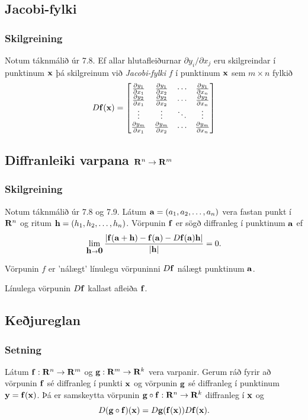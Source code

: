 \subsection{Jacobi-fylki} 
 \subsubsection{Skilgreining }
 Notum táknmálið úr 7.8.
Ef allar hlutafleiðurnar $\partial
y_i/\partial x_j$ eru skilgreindar í punktinum $\mbox{${\bf x}$}$ þá skilgreinum
við {\em Jacobi-fylki} $f$ í punktinum $\mbox{${\bf x}$}$ sem $m\times n$ fylkið
$$D\mbox{${\bf f}$}(\mbox{${\bf x}$})=\begin{bmatrix}
\frac{\partial y_1}{\partial x_1}&\frac{\partial y_1}{\partial x_2}&
\cdots&\frac{\partial y_1}{\partial x_n}\\
\frac{\partial y_2}{\partial x_1}&\frac{\partial y_2}{\partial x_2}&
\cdots&\frac{\partial y_2}{\partial x_n}\\
\vdots&\vdots&\ddots&\vdots\\
\frac{\partial y_m}{\partial x_1}&\frac{\partial y_m}{\partial x_2}&
\cdots&\frac{\partial y_m}{\partial x_n}
\end{bmatrix}$$



\subsection{Diffranleiki varpana $\mbox{${\bf R}^n$}\rightarrow\mbox{${\bf R}^m$}$} 
 \subsubsection{Skilgreining }
 Notum táknmálið úr 7.8 og 7.9. Látum $\mbox{${\bf a}$}=(a_1, a_2, \ldots, a_n)$ vera fastan punkt í $\mbox{${\bf R}^n$}$ og ritum 
$\mbox{${\bf h}$}=(h_1,h_2,\ldots,h_n)$.  Vörpunin $\mbox{${\bf f}$}$ er
sögð diffranleg í punktinum $\mbox{${\bf a}$}$ ef
$$\lim_{\mbox{${\bf h}$}\rightarrow
  \mbox{${\bf 0}$}}\frac{|\mbox{${\bf f}$}(\mbox{${\bf a}$}+\mbox{${\bf h}$})-\mbox{${\bf f}$}(\mbox{${\bf a}$})-D\mbox{${\bf f}$}(\mbox{${\bf a}$})\mbox{${\bf h}$}|}{|\mbox{${\bf h}$}|}=0.$$ 

\bigskip
Vörpunin $f$ er 'nálægt' línulegu vörpuninni $D\mbox{${\bf f}$}$ nálægt punktinum $\mbox{${\bf a}$}$.

\bigskip
Línulega vörpunin $D\mbox{${\bf f}$}$ kallast afleiða $\mbox{${\bf f}$}$.



\subsection{Keðjureglan} 
 \subsubsection{Setning }
Látum $\mbox{${\bf f}$}:\mbox{${\bf R}^n$}\rightarrow \mbox{${\bf R}^m$}$ og 
$\mbox{${\bf g}$}:\mbox{${\bf R}^m$}\rightarrow \mbox{${\bf R}^k$}$ vera varpanir.  Gerum ráð fyrir að vörpunin
$\mbox{${\bf f}$}$ sé diffranleg í punkti $\mbox{${\bf x}$}$ og vörpunin $\mbox{${\bf g}$}$ sé diffranleg í
punktinum $\mbox{${\bf y}$}=\mbox{${\bf f}$}(\mbox{${\bf x}$})$.  Þá er samskeytta vörpunin
$\mbox{${\bf g}$}\circ\mbox{${\bf f}$}:\mbox{${\bf R}^n$}\rightarrow\mbox{${\bf R}^k$}$ diffranleg í $\mbox{${\bf x}$}$ og 
$$D(\mbox{${\bf g}$}\circ\mbox{${\bf f}$})(\mbox{${\bf x}$})=D\mbox{${\bf g}$}(\mbox{${\bf f}$}(\mbox{${\bf x}$}))D\mbox{${\bf f}$}(\mbox{${\bf x}$}).$$





